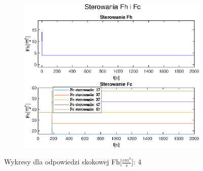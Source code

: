 \begin{figure}[h!]
   \begin{subfigure}[b]{0.6\textwidth}
      \includegraphics[width=1\linewidth]{img/step-responses/stepResponseU4.eps}
      \caption{}
      \label{fig:fig:stepResponsesFh43}
   \end{subfigure}
       
   \caption{Wykresy dla odpowiedzi skokowej Fh[$\frac{cm^3}{s}$]: 4}
   \label{fig:stepResponsesFh4}
\end{figure}
           
